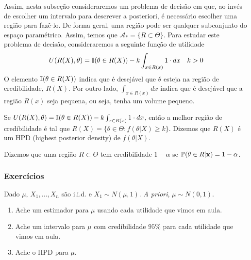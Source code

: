 Assim, nesta subseção consideraremos 
um problema de decisão em que,
ao invés de escolher um intervalo para 
descrever a posteriori,
é necessário escolher uma região para fazê-lo.
De forma geral, uma região pode ser 
qualquer subconjunto do espaço paramétrico.
Assim, temos que
$\mathcal{A}_{*} = \{R \subset \Theta\}$.
Para estudar este problema de decisão,
consideraremos a seguinte função de utilidade
\begin{align*}
 U(R(X),\theta)	
 &= {\mathbb I}(\theta \in R(X)) 
 -k\int_{x \in R(x)}{1 \cdot dx}
 & k > 0
\end{align*}
O elemento ${\mathbb I}(\theta \in R(X))$ indica que 
é desejável que $\theta$ esteja 
na região de credibilidade, $R(X)$.
Por outro lado,  $\int_{x \in R(x)}{dx}$ indica que
é desejável que a região $R(x)$ seja pequena, 
ou seja, tenha um volume pequeno.
\begin{theorem}
 \label{thm:hpd}
 Se $U(R(X),\theta)	= {\mathbb I}(\theta \in R(X)) - k\int_{x \in R(x)}{1 \cdot dx}$, então 
 a melhor região de credibilidade é tal que 
 $R(X) = \{\theta \in \Theta: f(\theta|X) \geq k\}$.
 Dizemos que $R(X)$ é um HPD (highest posterior density) 
 de $f(\theta|X)$.
\end{theorem}


\begin{definition}
Dizemos que uma região $R \subset \Theta$ tem credibilidade $1-\alpha$
se ${\mathbb P}(\theta \in R|{\mathbf{x}})=1-\alpha$.
\end{definition}

\subsubsection*{Exercícios}

\begin{exercise}
 \label{ex:normal-credible}
 Dado $\mu$, $X_{1},\ldots,X_{n}$ são i.i.d. e 
 $X_{1} \sim N(\mu,1)$.
 \emph{A priori}, $\mu \sim N(0,1)$.
 \begin{enumerate}[label=(\alph*)]
  \item Ache um estimador para $\mu$ usando 
  cada utilidade que vimos em aula.
  \item Ache um intervalo para $\mu$ com 
  credibilidade $95\%$ para 
  cada utilidade que vimos em aula.
  \item Ache o HPD para $\mu$.
 \end{enumerate}
\end{exercise}

